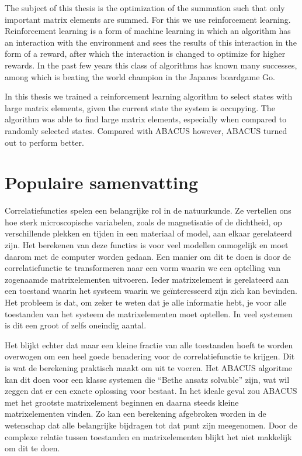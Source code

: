 \documentclass[11pt, a4paper]{report} %
\begin{document}
The subject of this thesis is the optimization of the summation such that only important matrix elements are summed.
For this we use reinforcement learning.
Reinforcement learning is a form of machine learning in which an algorithm has an interaction with the environment and sees the results of this interaction in the form of a reward, after which the interaction is changed to optimize for higher rewards.
In the past few years this class of algorithms has known many successes, among which is beating the world champion in the Japanes boardgame Go.

In this thesis we trained a reinforcement learning algorithm to select states with large matrix elements, given the current state the system is occupying.
The algorithm was able to find large matrix elements, especially when compared to randomly selected states.
Compared with ABACUS however, ABACUS turned out to perform better.

\section*{Populaire samenvatting}

Correlatiefuncties spelen een belangrijke rol in de natuurkunde.
Ze vertellen ons hoe sterk microscopische variabelen, zoals de magnetisatie of de dichtheid, op verschillende plekken en tijden in een materiaal of model, aan elkaar gerelateerd zijn.
Het berekenen van deze functies is voor veel modellen onmogelijk en moet daarom met de computer worden gedaan.
Een manier om dit te doen is door de correlatiefunctie te transformeren naar een vorm waarin we een optelling van zogenaamde matrixelementen uitvoeren.
Ieder matrixelement is gerelateerd aan een toestand waarin het systeem waarin we geïnteresseerd zijn zich kan bevinden.
Het probleem is dat, om zeker te weten dat je alle informatie hebt, je voor alle toestanden van het systeem de matrixelementen moet optellen.
In veel systemen is dit een groot of zelfs oneindig aantal.

Het blijkt echter dat maar een kleine fractie van alle toestanden hoeft te worden overwogen om een heel goede benadering voor de correlatiefunctie te krijgen.
Dit is wat de berekening praktisch maakt om uit te voeren.
Het ABACUS algoritme kan dit doen voor een klasse systemen die ``Bethe ansatz solvable'' zijn, wat wil zeggen dat er een exacte oplossing voor bestaat.
In het ideale geval zou ABACUS met het grootste matrixelement beginnen en daarna steeds kleine matrixelementen vinden.
Zo kan een berekening afgebroken worden in de wetenschap dat alle belangrijke bijdragen tot dat punt zijn meegenomen.
Door de complexe relatie tussen toestanden en matrixelementen blijkt het niet makkelijk om dit te doen.
\end{document}
